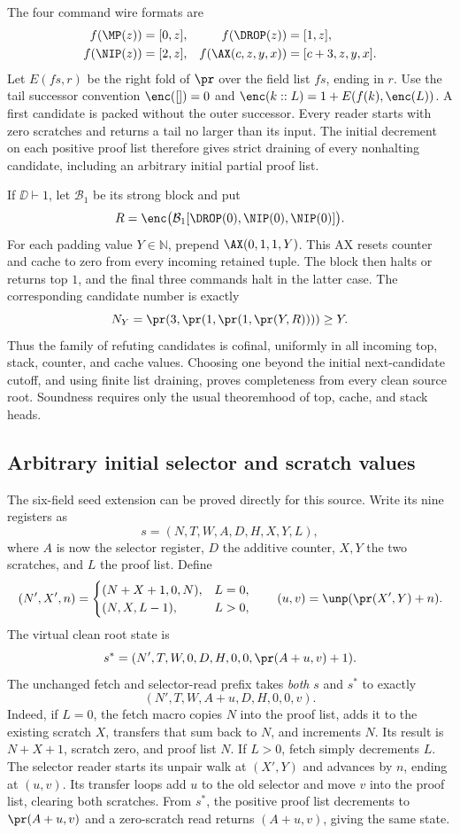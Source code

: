 The four command wire formats are
\[
 \begin{aligned}
 f(\MP(z))&=[0,z], &f(\DROP(z))&=[1,z],\\
 f(\NIP(z))&=[2,z],&f(\AX(c,z,y,x))&=[c+3,z,y,x].
 \end{aligned}
\]
Let $E(fs,r)$ be the right fold of $\pr$ over the field list $fs$, ending
in $r$.  Use the tail successor convention
$\enc([])=0$ and $\enc(k::L)=1+E(f(k),\enc(L))$.  A first candidate
is packed without the outer successor.  Every reader starts with zero
scratches and returns a tail no larger than its input.  The initial
decrement on each positive proof list therefore gives strict draining
of every nonhalting candidate, including an arbitrary initial partial
proof list.

If $\DD\vdash1$, let $\mathcal B_1$ be its strong block and put
\[
 R=\enc\bigl(\mathcal B_1[\DROP(0),\NIP(0),\NIP(0)]\bigr).
\]
For each padding value $Y\in\mathbb N$, prepend
$\AX(0,1,1,Y)$.  This AX resets counter and cache to zero from every
incoming retained tuple.  The block then halts or returns top $1$,
and the final three commands halt in the latter case.  The corresponding
candidate number is exactly
\[
 N_Y=\pr(3,\pr(1,\pr(1,\pr(Y,R))))\geq Y.
\]
Thus the family of refuting candidates is cofinal, uniformly in all
incoming top, stack, counter, and cache values.  Choosing one beyond the
initial next-candidate cutoff, and using finite list draining, proves
completeness from every clean source root.  Soundness requires only the
usual theoremhood of top, cache, and stack heads.

\subsection{Arbitrary initial selector and scratch values}

The six-field seed extension can be proved directly for this source.
Write its nine registers as
\[
 s=(N,T,W,A,D,H,X,Y,L),
\]
where $A$ is now the selector register, $D$ the additive counter, $X,Y$
the two scratches, and $L$ the proof list.  Define
\[
 (N',X',n)=
 \begin{cases}
 (N+X+1,0,N),&L=0,\\
 (N,X,L-1),&L>0,
 \end{cases}
 \qquad (u,v)=\unp(\pr(X',Y)+n).
\]
The virtual clean root state is
\[
 s^*=(N',T,W,0,D,H,0,0,\pr(A+u,v)+1).
\]
The unchanged fetch and selector-read prefix takes \emph{both} $s$ and
$s^*$ to exactly
\[
 (N',T,W,A+u,D,H,0,0,v).
\]
Indeed, if $L=0$, the fetch macro copies $N$ into the proof list, adds
it to the existing scratch $X$, transfers that sum back to $N$, and
increments $N$.  Its result is $N+X+1$, scratch zero, and proof list
$N$.  If $L>0$, fetch simply decrements $L$.  The selector reader starts
its unpair walk at $(X',Y)$ and advances by $n$, ending at $(u,v)$.
Its transfer loops add $u$ to the old selector and move $v$ into the
proof list, clearing both scratches.  From $s^*$, the positive proof
list decrements to $\pr(A+u,v)$ and a zero-scratch read returns
$(A+u,v)$, giving the same state.

